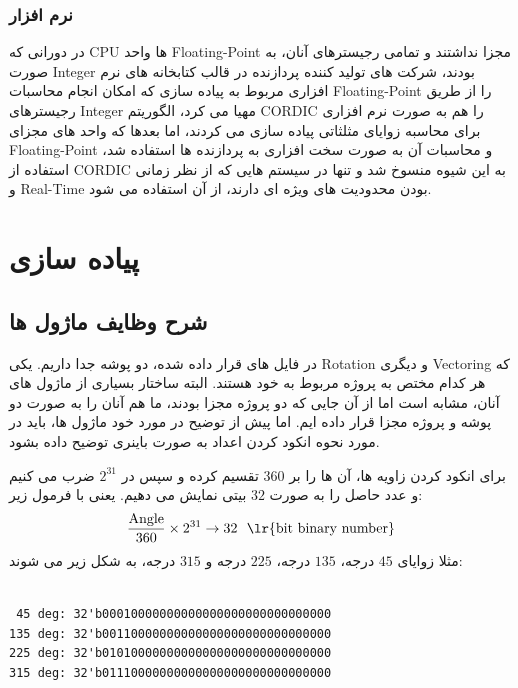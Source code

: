 \documentclass[12pt,titlepage,a4page , tikz , multi,table , svgnames,xcdraw]{article}
\begin{document}
\subsubsection{نرم افزار}

در دورانی که CPU ها واحد Floating-Point مجزا نداشتند و تمامی رجیسترهای آنان، به صورت Integer بودند، شرکت های تولید کننده پردازنده در قالب کتابخانه های نرم افزاری مربوط به پیاده سازی  که امکان انجام محاسبات Floating-Point را از طریق رجیسترهای Integer مهیا می کرد، الگوریتم CORDIC را هم به صورت نرم افزاری برای محاسبه زوایای مثلثاتی پیاده سازی می کردند، اما بعدها که واحد های مجزای Floating-Point و محاسبات آن به صورت سخت افزاری به پردازنده ها استفاده شد، استفاده از CORDIC به این شیوه منسوخ شد و تنها در سیستم هایی که از نظر زمانی و Real-Time بودن محدودیت های ویژه ای دارند، از آن استفاده می شود. \cite{wikipedia}


\newpage


\section{پیاده سازی}

\subsection{شرح وظایف ماژول ها}

در فایل های قرار داده شده، دو پوشه جدا داریم. یکی Rotation و دیگری Vectoring که هر کدام مختص به پروژه مربوط به خود هستند. البته ساختار بسیاری از ماژول های آنان، مشابه است اما از آن جایی که دو پروژه مجزا بودند، ما هم آنان را به صورت دو پوشه و پروژه مجزا قرار داده ایم. اما پیش از توضیح در مورد خود ماژول ها، باید در مورد نحوه انکود کردن اعداد به صورت باینری توضیح داده بشود.

برای انکود کردن زاویه ها، آن ها را بر $360$ تقسیم کرده و سپس در $2^{31}$ ضرب می کنیم و عدد حاصل را به صورت $32$ بیتی نمایش می دهیم. یعنی با فرمول زیر:
$$\frac{\text{Angle}}{360} \times 2^{31} \rightarrow 32 ~~\text{\lr{bit binary number}}$$
 مثلا زوایای $45$ درجه، $135$ درجه، $225$ درجه و $315$ درجه، به شکل زیر می شوند:

\begin{latin}
\begin{verbatim}

 45 deg: 32'b00010000000000000000000000000000
135 deg: 32'b00110000000000000000000000000000
225 deg: 32'b01010000000000000000000000000000
315 deg: 32'b01110000000000000000000000000000

\end{verbatim}
\end{latin} 
\end{document}
